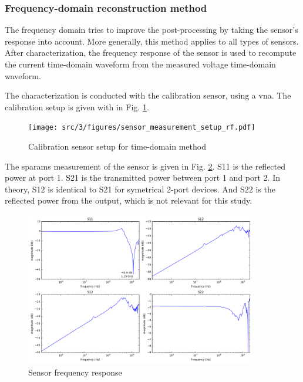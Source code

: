 \subsubsection{Frequency-domain reconstruction method}
The frequency domain tries to improve the post-processing by taking the sensor's response into account.
More generally, this method applies to all types of sensors.
After characterization, the frequency response of the sensor is used to recompute the current time-domain waveform from the measured voltage time-domain waveform.

The characterization is conducted with the calibration sensor, using a \gls{vna}.
The calibration setup is given with in Fig. \ref{fig:calibration-sensor-rf}.

\begin{figure}[!htbp]
  \centering
  \texttt{[image: src/3/figures/sensor\_measurement\_setup\_rf.pdf]}
  \caption{Calibration sensor setup for time-domain method}
  \label{fig:calibration-sensor-rf}
\end{figure}

The \gls{sparams} measurement of the sensor is given in Fig. \ref{fig:sensor-response}.
S11 is the reflected power at port 1.
S21 is the transmitted power between port 1 and port 2.
In theory, S12 is identical to S21 for symetrical 2-port devices.
And S22 is the reflected power from the output, which is not relevant for this study.

\begin{figure}[!htbp]
  \centering
  \includegraphics[width=0.9\textwidth]{src/3/figures/sensor_freq_response.png}
  \caption{Sensor frequency response}
  \label{fig:sensor-response}
\end{figure}

